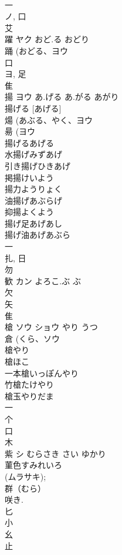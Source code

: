 \documentclass[8pt]{extreport}
\begin{document}
\begin{CJK}{UTF8}{min}
\\	一 
\\	ノ, 口 
\\	艾 
\\	躍	ヤク	おど.る おどり	
\\	踊 (おどる、ヨウ 
\\	口 
\\	ヨ, 足 
\\	隹 
\\	揚	ヨウ	あ.げる あ.がる あがり	
\\	揚げる [あげる] 
\\	煬 (あぶる、やく、ヨウ 
\\	昜 (ヨウ 
\\	揚げるあげる
\\	水揚げみずあげ
\\	引き揚げひきあげ
\\	掲揚けいよう
\\	揚力ようりょく
\\	油揚げあぶらげ
\\	抑揚よくよう
\\	揚げ足あげあし
\\	揚げ油あげあぶら
\\	一 
\\	扎, 日 
\\	勿 
\\	歓	カン	よろこ.ぶ ぶ	
\\	欠 
\\	矢 
\\	隹 
\\	槍	ソウ ショウ	やり うつ	
\\	倉 (くら、ソウ 
\\	槍やり 
\\	槍ほこ 
\\	一本槍いっぽんやり 
\\	竹槍たけやり 
\\	槍玉やりだま 
\\	一 
\\	个 
\\	口 
\\	木 
\\	紫	シ	むらさき さい ゆかり	
\\	菫色すみれいろ 
\\	(ムラサキ); 
\\	群（むら）
\\	咲き. 
\\	匕 
\\	小 
\\	幺 
\\	止 

\end{CJK}
\end{document}
